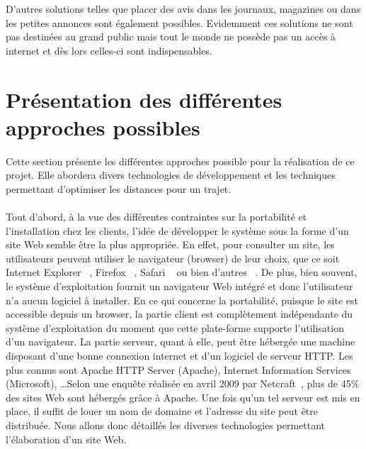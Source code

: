 \documentclass[12pt, a4paper, oneside]{article}
\begin{document}
    \indent D'autres solutions telles que placer des avis dans les journaux, magazines ou dans les petites annonces sont également possibles. Evidemment ces solutions ne sont pas destinées au grand public mais tout le monde ne possède pas un accès à internet et dès lors celles-ci sont indispensables.
\section{Présentation des différentes approches possibles}
    Cette section présente les différentes approches possible pour la réalisation de ce projet. Elle abordera divers technologies de développement et les techniques permettant d'optimiser les distances pour un trajet.\\\\
    \indent Tout d'abord, à la vue des différentes contraintes sur la portabilité et l'installation chez les clients, l'idée de développer le système sous la forme d'un site Web semble être la plus appropriée. En effet, pour consulter un site, les utilisateurs peuvent utiliser le navigateur (browser) de leur choix, que ce soit Internet Explorer ~\cite{internet-explorer}, Firefox ~\cite{firefox}, Safari ~\cite{safari} ou bien d'autres ~\cite{browser-list}. De plus, bien souvent, le système d'exploitation fournit un navigateur Web intégré et donc l'utilisateur n'a aucun logiciel à installer. En ce qui concerne la portabilité, puisque le site est accessible depuis un browser, la partie client est complètement indépendante du système d'exploitation du moment que cette plate-forme supporte l'utilisation d'un navigateur. La partie serveur, quant à elle, peut être hébergée une machine disposant d'une bonne connexion internet et d'un logiciel de serveur HTTP. Les plus connus sont Apache HTTP Server (Apache), Internet Information Services (Microsoft), \dots Selon une enquête réalisée en avril 2009 par Netcraft~\cite{server-survey}, plus de 45$\%$ des sites Web sont hébergés grâce à Apache. Une fois qu'un tel serveur est mis en place, il suffit de louer un nom de domaine et l'adresse du site peut être distribuée. Nous allons donc détaillés les diverses technologies permettant l'élaboration d'un site Web.\\\\
\end{document}
